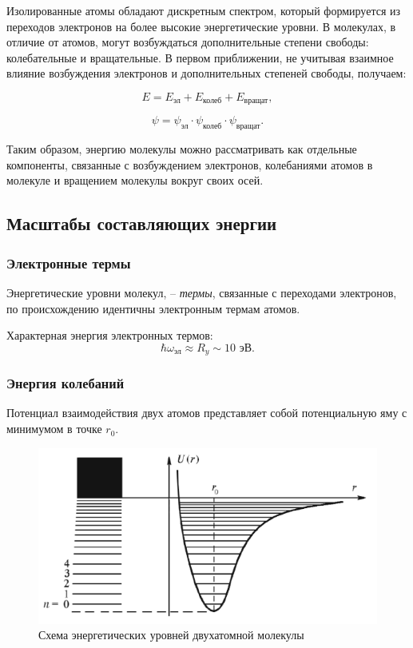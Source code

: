 \documentclass[a4paper, 12pt]{article}
\begin{document}
    Изолированные атомы обладают дискретным спектром, который формируется из переходов электронов на более высокие энергетические уровни. В молекулах, в отличие от атомов, могут возбуждаться дополнительные степени свободы: колебательные и вращательные. В первом приближении, не учитывая взаимное влияние возбуждения электронов и дополнительных степеней свободы, получаем:

    \begin{equation}
        E = E_{\text{эл}} + E_{\text{колеб}} + E_{\text{вращат}},
    \end{equation}

    \begin{equation}
        \psi = \psi_{\text{эл}} \cdot \psi_{\text{колеб}} \cdot \psi_{\text{вращат}}.
    \end{equation}

    Таким образом, энергию молекулы можно рассматривать как отдельные компоненты, связанные с возбуждением электронов, колебаниями атомов в молекуле и вращением молекулы вокруг своих осей.

    \subsection{Масштабы составляющих энергии}

    \subsubsection{Электронные термы}

    Энергетические уровни молекул, -- \textit{термы}, связанные с переходами электронов, по происхождению идентичны электронным термам атомов.

    Характерная энергия электронных термов:
    \begin{equation}
        \hbar \omega_{\text{эл}} \approx R_y \sim 10 \text{ эВ}.
    \end{equation}

    \subsubsection{Энергия колебаний}

    Потенциал взаимодействия двух атомов представляет собой потенциальную яму с минимумом в точке $r_0$.

    \begin{figure}[H]
        \centering
        \includegraphics[width=0.6\linewidth]{images/ocsillation_levels.png}
        \caption{Схема энергетических уровней двухатомной молекулы}
        \label{fig:oscillation_levels}
    \end{figure}
\end{document}
